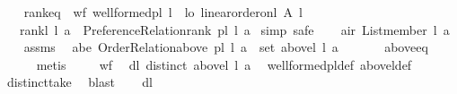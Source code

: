 \begin{isabellebody}
%
\endisatagproof
{\isafoldproof}%
%
\isadelimproof
\isanewline
%
\endisadelimproof
\ \ \isanewline
{}\isamarkupfalse%
\ rankeq{\isacharcolon}{\kern0pt}\ \ wf{\isacharcolon}{\kern0pt}\ {\isachardoublequoteopen}well{\isacharunderscore}{\kern0pt}formed{\isacharunderscore}{\kern0pt}pl\ l{\isachardoublequoteclose}\ \ lo{\isacharcolon}{\kern0pt}\ {\isachardoublequoteopen}linear{\isacharunderscore}{\kern0pt}order{\isacharunderscore}{\kern0pt}on{\isacharunderscore}{\kern0pt}l\ A\ l{\isachardoublequoteclose}\isanewline
\ \ \ {\isachardoublequoteopen}rank{\isacharunderscore}{\kern0pt}l\ l\ a\ {\isacharequal}{\kern0pt}\ Preference{\isacharunderscore}{\kern0pt}Relation{\isachardot}{\kern0pt}rank\ {\isacharparenleft}{\kern0pt}pl{\isacharunderscore}{\kern0pt}{\isasymalpha}\ l{\isacharparenright}{\kern0pt}\ a{\isachardoublequoteclose}\isanewline
%
\isadelimproof
%
\endisadelimproof
%
\isatagproof
{}\isamarkupfalse%
\ {\isacharparenleft}{\kern0pt}simp{\isacharcomma}{\kern0pt}\ safe{\isacharparenright}{\kern0pt}\isanewline
\ \ \isamarkupfalse%
\ air{\isacharcolon}{\kern0pt}\ {\isachardoublequoteopen}List{\isachardot}{\kern0pt}member\ l\ a{\isachardoublequoteclose}\isanewline
\ \ \isamarkupfalse%
\ assms\ \isamarkupfalse%
\ abe{\isacharcolon}{\kern0pt}\ {\isachardoublequoteopen}Order{\isacharunderscore}{\kern0pt}Relation{\isachardot}{\kern0pt}above\ {\isacharparenleft}{\kern0pt}pl{\isacharunderscore}{\kern0pt}{\isasymalpha}\ l{\isacharparenright}{\kern0pt}\ a\ {\isacharequal}{\kern0pt}\ set\ {\isacharparenleft}{\kern0pt}above{\isacharunderscore}{\kern0pt}l\ l\ a{\isacharparenright}{\kern0pt}{\isachardoublequoteclose}\ \isanewline
\ \ \ \ \isamarkupfalse%
\ aboveeq\isanewline
\ \ \ \ \isamarkupfalse%
\ metis\ \isanewline
\ \ \isamarkupfalse%
\ wf\ \isamarkupfalse%
\ dl{\isacharcolon}{\kern0pt}\ {\isachardoublequoteopen}distinct\ {\isacharparenleft}{\kern0pt}above{\isacharunderscore}{\kern0pt}l\ l\ a{\isacharparenright}{\kern0pt}{\isachardoublequoteclose}\ \isamarkupfalse%
\ well{\isacharunderscore}{\kern0pt}formed{\isacharunderscore}{\kern0pt}pl{\isacharunderscore}{\kern0pt}def\ above{\isacharunderscore}{\kern0pt}l{\isacharunderscore}{\kern0pt}def\isanewline
\ \ \ \ \isamarkupfalse%
\ distinct{\isacharunderscore}{\kern0pt}take\ \isamarkupfalse%
\ blast\isanewline
\ \ \isamarkupfalse%
\ dl\ \isamarkupfalse%

\end{isabellebody}

